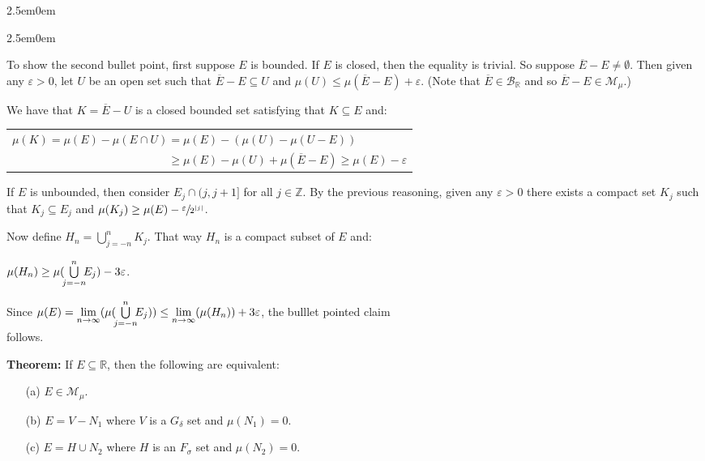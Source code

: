 \documentclass{book}
\newenvironment{myIndent}{%
   \begin{adjustwidth}{2.5em}{0em}%
}{%
   \end{adjustwidth}%
}
\newcommand{\blab}[1]{\textbf{#1}}
\newcommand{\retTwo}{\hfill\bigbreak}
\begin{document}
\begin{myIndent}
\begin{itemize}
\begin{myIndent}
         To show the second bullet point, first suppose $E$ is bounded. If $E$ is closed, then the equality is trivial. So suppose $\overline{E} - E \neq \emptyset$. Then given any $\varepsilon > 0$, let $U$ be an open set such that $\overline{E} - E \subseteq U$ and $\mu(U) \leq \mu(\overline{E} - E) + \varepsilon$. (Note that $\overline{E} \in \mathcal{B}_\mathbb{R}$ and so $\overline{E} - E \in \mathcal{M}_\mu$.)\retTwo

         We have that $K = \overline{E} - U$ is a closed bounded set satisfying that $K \subseteq E$ and:

         {\centering 
         \begin{tabular}{l}
            $\mu(K) = \mu(E) - \mu(E \cap U) = \mu(E) - (\mu(U) - \mu(U - E))$\\ $\phantom{\mu(K) = \mu(E) - \mu(E \cap U)} \geq \mu(E) - \mu(U) + \mu(\overline{E} - E) \geq \mu(E) - \varepsilon$
         \end{tabular} \newpage\par}

         If $E$ is unbounded, then consider $E_j \cap (j, j+1]$ for all $j \in \mathbb{Z}$. By the previous reasoning, given any $\varepsilon > 0$ there exists a compact set $K_j$ such that $K_j \subseteq E_j$ and $\mu(K_j) \geq \mu(E) - \sfrac{\varepsilon}{2^{|j|}}$.\retTwo

         Now define $H_n = \bigcup\limits_{j=-n}^nK_j$. That way $H_n$ is a compact subset of $E$ and:\\ [-10pt]
         
         {\centering $\mu(H_n) \geq \mu(\hspace{-0.2em}\bigcup\limits_{j=-n}^n\hspace{-0.4em} E_j) - 3\varepsilon$.\\ [2pt]\par}

         Since $\mu(E) = \lim\limits_{n \rightarrow \infty}(\mu(\hspace{-0.2em}\bigcup\limits_{j=-n}^n\hspace{-0.4em} E_j)) \leq \lim\limits_{n \rightarrow \infty}(\mu(H_n)) + 3\varepsilon$, the bulllet pointed claim\\ [-8pt] follows.\retTwo
      \end{myIndent}
   \end{itemize}

   \blab{Theorem:} If $E \subseteq \mathbb{R}$, then the following are equivalent:
   \begin{itemize}
      \item[(a)] $E \in \mathcal{M}_\mu$.
      \item[(b)] $E = V - N_1$ where $V$ is a $G_\delta$ set and $\mu(N_1) = 0$.
      \item[(c)] $E = H \cup N_2$ where $H$ is an $F_\sigma$ set and $\mu(N_2) = 0$.\retTwo
      

\end{itemize}
\end{myIndent}
\end{document}
